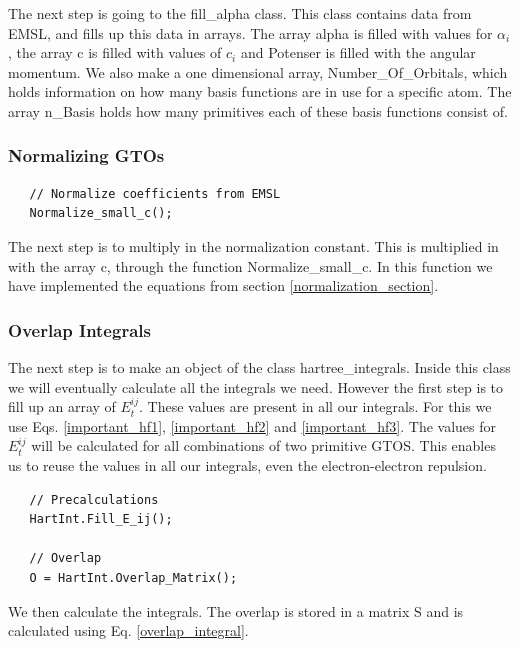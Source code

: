 \documentclass[a4paper,norsk,11pt,twoside]{report}
\begin{document}
The next step is going to the fill\_alpha class. This class contains data from EMSL, and fills up this data in arrays. The array alpha is filled with values for $\alpha_i$, the array c is filled with values of $c_i$ and Potenser is filled with the angular momentum. We also make a one dimensional array, Number\_Of\_Orbitals, which holds information on how many basis functions are in use for a specific atom. The array n\_Basis holds how many primitives each of these basis functions consist of. \\

\subsubsection{Normalizing GTOs}
\begin{lstlisting}
   // Normalize coefficients from EMSL
   Normalize_small_c();
\end{lstlisting}

The next step is to multiply in the normalization constant. This is multiplied in with the array c, through the function Normalize\_small\_c. In this function we have implemented the equations from section \ref{normalization_section}. \\

\subsubsection{Overlap Integrals}
The next step is to make an object of the class hartree\_integrals. Inside this class we will eventually calculate all the integrals we need. However the first step is to fill up an array of $E_t^{ij}$. These values are present in all our integrals. For this we use Eqs. \eqref{important_hf1}, \eqref{important_hf2} and \eqref{important_hf3}. The values for $E_t^{ij}$ will be calculated for all combinations of two primitive GTOS. This enables us to reuse the values in all our integrals, even the electron-electron repulsion. \\

\begin{lstlisting}
   // Precalculations
   HartInt.Fill_E_ij();

   // Overlap
   O = HartInt.Overlap_Matrix();
\end{lstlisting}

We then calculate the integrals. The overlap is stored in a matrix S and is calculated using Eq. \eqref{overlap_integral}. \\
\end{document}
